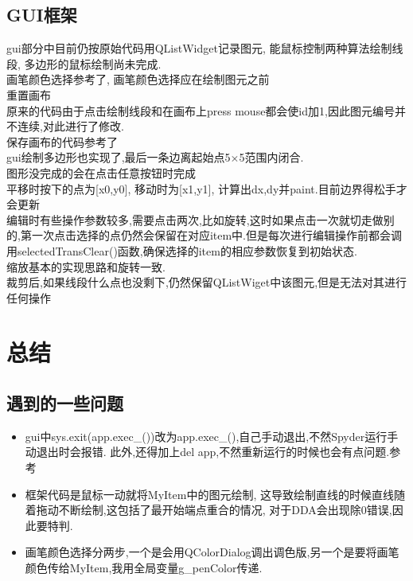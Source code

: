 \documentclass[a4paper,UTF8]{article}
\theoremstyle{definition}
\begin{document}
\subsection{GUI框架}
gui部分中目前仍按原始代码用QListWidget记录图元, 能鼠标控制两种算法绘制线段,
多边形的鼠标绘制尚未完成.\\
画笔颜色选择参考了\cite{pyqt5_ch}, 画笔颜色选择应在绘制图元之前\\
重置画布\\
原来的代码由于点击绘制线段和在画布上press mouse都会使id加1,因此图元编号并不连续,对此进行了修改.\\
保存画布的代码参考了\cite{save_canvas}\\
gui绘制多边形也实现了,最后一条边离起始点5$\times$5范围内闭合.\\
图形没完成的会在点击任意按钮时完成\\
平移时按下的点为[x0,y0], 移动时为[x1,y1], 计算出dx,dy并paint.目前边界得松手才会更新\\
编辑时有些操作参数较多,需要点击两次,比如旋转,这时如果点击一次就切走做别的,第一次点击选择的点仍然会保留在对应item中.但是每次进行编辑操作前都会调用selectedTransClear()函数,确保选择的item的相应参数恢复到初始状态.\\
缩放基本的实现思路和旋转一致.\\
裁剪后,如果线段什么点也没剩下,仍然保留QListWiget中该图元,但是无法对其进行任何操作\\
\section{总结}
\subsection{遇到的一些问题}
\begin{itemize}
	\item gui中sys.exit(app.exec\_())改为app.exec\_(),自己手动退出,不然Spyder运行手动退出时会报错.
	此外,还得加上del app,不然重新运行的时候也会有点问题.参考\cite{exit}
	
	\item 框架代码是鼠标一动就将MyItem中的图元绘制,
	这导致绘制直线的时候直线随着拖动不断绘制,这包括了最开始端点重合的情况,
	对于DDA会出现除0错误,因此要特判.
	
	\item 画笔颜色选择分两步,一个是会用QColorDialog调出调色版,另一个是要将画笔颜色传给MyItem,我用全局变量g\_penColor传递.
\end{itemize}

%

\end{document}
